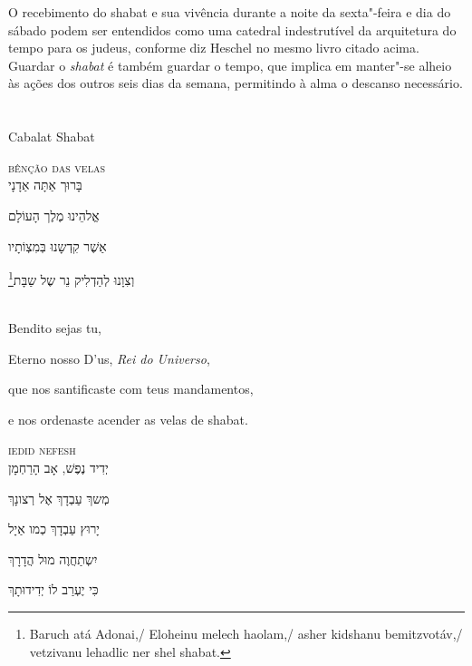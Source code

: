 O recebimento do shabat e sua vivência durante a noite da sexta"-feira e
dia do sábado podem ser entendidos como uma catedral indestrutível da
arquitetura do tempo para os judeus, conforme diz Heschel no mesmo livro
citado acima. Guardar o \emph{shabat} é também guardar o tempo, que implica em
manter"-se alheio às ações dos outros seis dias da semana, permitindo à
alma o descanso necessário.

\chapter*{}
\begin{center}
\begin{vplace}[0.3]
\Large
Cabalat Shabat
\end{vplace}
\end{center}
\thispagestyle{empty}


\movetoevenpage
\raggedleft

\textsc{bênção das velas}\\[15pt]

בָּרוּך אַתָּה אַדָנָי

אֱלהֵינוּ מֶלֶך הָעוֹלָם

אַשֶׁר קִדְשָנוּ בְּמִצְוֹתָיו

וְצִוָנוּ לְהַדְלִיק נֵר שֶל שַבָּת‏\footnote{Baruch atá Adonai,/ Eloheinu melech haolam,/ asher kidshanu bemitzvotáv,/ vetzivanu lehadlic ner shel shabat.}

\movetooddpage
\raggedright

\textsc{}\\[15pt]

Bendito sejas tu,

Eterno nosso D'us, \emph{Rei do Universo},

que nos santificaste com teus mandamentos,

e nos ordenaste acender as velas de shabat.

\movetoevenpage
\raggedleft

\textsc{iedid nefesh}\\[15pt]

יְדִיד נֶפֶשׁ, אָב הָרַחְמָן

מְשךְ עַבְדָךְ אֶל רְצונָךְ

יָרוּץ עַבְדָךְ כְמו אַיָל

יִשְתַחֲוֶה מוּל הֲדָרָךְ

כִּי יֶעְרַב לוֹ יְדִידוּתָךְ

